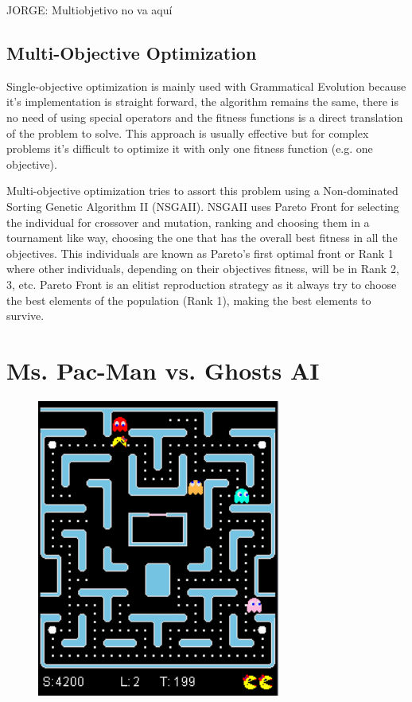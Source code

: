 \documentclass{llncs}
\newcommand{\pacman}{Ms. Pac-Man vs. Ghosts }
\begin{document}
{\color{red}JORGE: Multiobjetivo no va aquí
\subsection{Multi-Objective Optimization}
Single-objective optimization is mainly used with Grammatical Evolution because it's implementation is straight forward, the algorithm remains the same, there is no need of using special operators and the fitness functions is a direct translation of the problem to solve. This approach is usually effective but for complex problems it's difficult to optimize it with only one fitness function (e.g. one objective).

Multi-objective optimization tries to assort this problem using a Non-dominated Sorting Genetic Algorithm II (NSGAII). NSGAII uses Pareto Front %
for selecting the individual for crossover and mutation, ranking and choosing them in a tournament like way, choosing the one that has the overall best fitness in all the objectives. This individuals are known as Pareto's first optimal front or Rank 1 where other individuals, depending on their objectives fitness, will be in Rank 2, 3, etc. Pareto Front is an elitist reproduction strategy as it always try to choose the best elements of the population (Rank 1), making the best elements to survive. %
}

%
\section{\pacman AI}
\label{sec:pacmanai}
%


\begin{figure}[H]
	\centering
	\includegraphics[width=8cm]{images/PacMan_ss.png}
\end{figure}
\end{document}
